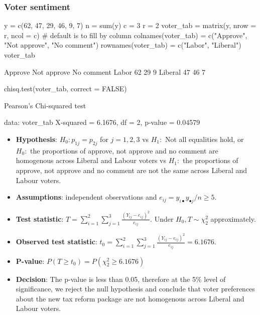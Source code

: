 \documentclass[a4paper]{article}\usepackage[]{graphicx}\usepackage[]{xcolor}
\begin{document}
\subsubsection{Voter sentiment}
\begin{Schunk}
\begin{Sinput}
y = c(62, 47, 29, 46, 9, 7)
n = sum(y)
c = 3
r = 2
voter_tab = matrix(y, nrow = r, ncol = c)  
# default is to fill by column
colnames(voter_tab) = c("Approve", 
                        "Not approve",
                        "No comment")
rownames(voter_tab) = c("Labor", "Liberal")
voter_tab
\end{Sinput}
\begin{Soutput}
        Approve Not approve No comment
Labor        62          29          9
Liberal      47          46          7
\end{Soutput}
\begin{Sinput}
chisq.test(voter_tab, correct = FALSE)
\end{Sinput}
\begin{Soutput}

	Pearson's Chi-squared test

data:  voter_tab
X-squared = 6.1676, df = 2, p-value = 0.04579
\end{Soutput}
\end{Schunk}
\begin{itemize}
	\item \textbf{Hypothesis}: \( H_0: p_{1j} = p_{2j} \) for \( j = 1,2,3 \) vs \( H_1: \) Not all equalities hold, or \( H_0: \)  the proportions of approve, not approve and no comment are homogenous across Liberal and Labour voters vs \( H_1: \)  the proportions of approve, not approve and no comment are not the same across Liberal and Labour voters.
	\item \textbf{Assumptions}: independent observations and \( e_{ij} =y_{i \bullet} y_{\bullet j}/n \geq 5 \).
	\item \textbf{Test statistic}: \( T = \sum\limits_{i=1}^{2}\sum\limits_{j=1}^{3} \frac{(Y_{ij} - e_{ij})^2}{e_{ij}} \). Under \( H_0, T \sim \chi^2_2 \) approximately.
	\item \textbf{Observed test statistic}: \( t_0 = \sum\limits_{i=1}^{2}\sum\limits_{j=1}^{3} \frac{(Y_{ij} - e_{ij})^2}{e_{ij}} = 6.1676 \).
	\item \textbf{P-value}: \( P(T \geq t_0) = P(\chi^2_2 \geq 6.1676) \)
	\item \textbf{Decision}: The p-value is less than 0.05, therefore at the 5\% level of significance, we reject the null hypothesis and conclude that voter preferences about the new tax reform package are not homogenous across Liberal and Labour voters.
\end{itemize}
\end{document}
